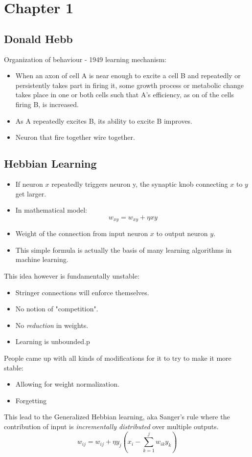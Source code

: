 \section{Chapter 1}

\subsection{Donald Hebb} 
Organization of behaviour - 1949 learning mechanism:
\begin{itemize}
	\item When an axon of cell A is near enough to excite a cell B and repeatedly or persistently takes part in firing it, some growth process or metabolic change takes place in one or both cells such that A's efficiency, as on of the cells firing B, is increased.
	\item As A repeatedly excites B, its ability to excite B improves.
	\item Neuron that fire together wire together.
\end{itemize}

\subsection{Hebbian Learning}
\begin{itemize}
	\item If neuron $x$ repeatedly triggers neuron y, the synaptic knob connecting $x$ to $y$ get larger.
	\item In mathematical model:
	\[ w_{xy} = w_{xy} + \eta xy \]
	\item Weight of the connection from input neuron $x$ to output neuron $y$.
	\item This simple formula is actually the basis of many learning algorithms in machine learning.
\end{itemize}

This idea however is fundamentally unstable:
\begin{itemize}
	\item Stringer connections will enforce themselves.
	\item No notion of "competition".
	\item No \textit{reduction} in weights.
	\item Learning is unbounded.p
\end{itemize}

People came up with all kinds of modifications for it to try to make it more stable:
\begin{itemize}
	\item Allowing for weight normalization.
	\item Forgetting
\end{itemize}
This lead to the Generalized Hebbian learning, aka Sanger's rule where the contribution of input is \textit{incrementally distributed} over multiple outputs.
\[ w_{ij} = w_{ij} + \eta y_j\left( x_i -	\sum_{k=1}^{j}	w_{ik}y_k																									\right) \]


